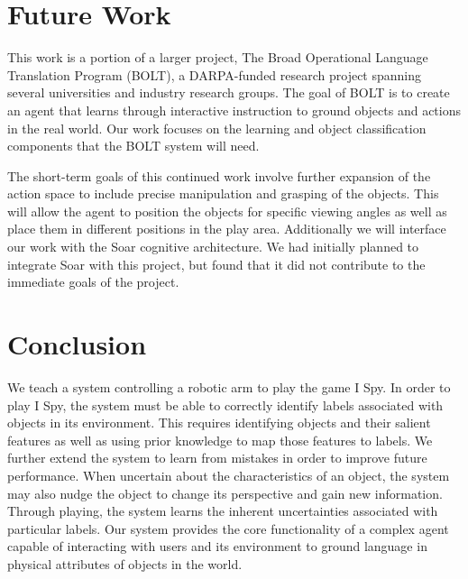 \documentclass[11pt]{article}
\newcommand{\xxx}[1]{{\bf \color{red} #1}}
\begin{document}
\section{Future Work}
\label{sec:future-work}
This work is a portion of a larger project, The Broad Operational Language
Translation Program (BOLT), a DARPA-funded research project spanning several
universities and industry research groups. The goal of BOLT is to create an
agent that learns through interactive instruction to ground objects and
actions in the real world. Our work focuses on the learning and object
classification components that the BOLT system will need.

The short-term goals of this continued work involve further expansion of the
action space to include precise manipulation and grasping of the objects. This
will allow the agent to position the objects for specific viewing angles as
well as place them in different positions in the play area. Additionally we will
interface our work with the Soar cognitive architecture. We had initially planned to
integrate Soar with this project, but found that it did not contribute
to the immediate goals of the project.

\section{Conclusion}
We teach a system controlling a robotic arm to play the game I Spy.
In order to play I Spy, the system must be able to correctly identify labels
associated with objects in its environment. This requires identifying objects
and their salient features as well as using prior knowledge to map those features
to labels. We further extend the system to learn from mistakes in order to
improve future performance. When uncertain about the characteristics of an
object, the system may also nudge the object to change its perspective and
gain new information. Through playing, the system learns the inherent
uncertainties associated with particular labels. Our system provides the core
functionality of a complex agent capable of interacting with users and its
environment to ground language in physical attributes of objects in the world.



\end{document}
